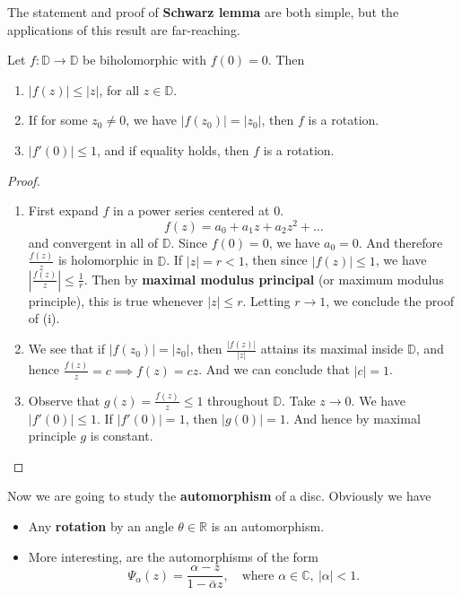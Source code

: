 \documentclass{article}
\begin{document}
The statement and proof of \textbf{Schwarz lemma} are both simple, but the applications of this result are far-reaching.

\begin{lemma}
Let $f: \mathbb{D} \to \mathbb{D}$ be biholomorphic with $f(0)=0$. Then
\begin{enumerate}
    \item $|f(z)| \le |z|$, for all $z \in \mathbb{D}$.
    \item If for some $z_0 \ne 0$, we have $|f(z_0)| = |z_0|$, then $f$ is a rotation.
    \item $|f'(0)| \le 1$, and if equality holds, then $f$ is a rotation.
\end{enumerate}
\end{lemma}


\begin{proof} 
    \begin{enumerate}
\item
First expand $f$ in a power series centered at $0$.
$$f(z) = a_0 + a_1 z + a_2 z^2 + \dots$$
and convergent in all of $\mathbb{D}$. Since $f(0) = 0$, we have $a_0 = 0$.
And therefore $\frac{f(z)}{z}$ is holomorphic in $\mathbb{D}$. If $|z| = r < 1$, then since $|f(z)| \le 1$, we have $|\frac{f(z)}{z}| \le \frac{1}{r}$. Then by \textbf{maximal modulus principal} (or maximum modulus principle), this is true whenever $|z| \le r$.
Letting $r \to 1$, we conclude the proof of (i).
\item 
We see that if $|f(z_0)| = |z_0|$, then $\frac{|f(z)|}{|z|}$ attains its maximal inside $\mathbb{D}$, and hence $\frac{f(z)}{z} = c \implies f(z) = c z$.
And we can conclude that $|c| = 1$.
\item 
Observe that $g(z) = \frac{f(z)}{z} \le 1$ throughout $\mathbb{D}$.
Take $z \to 0$. We have $|f'(0)| \le 1$. If $|f'(0)| = 1$, then $|g(0)| = 1$.
And hence by maximal principle $g$ is constant.
    \end{enumerate}
\end{proof}

Now we are going to study the \textbf{automorphism} of a disc.
Obviously we have
\begin{itemize}
    \item Any \textbf{rotation} by an angle $\theta \in \mathbb{R}$ is an automorphism.
    \item More interesting, are the automorphisms of the form
    $$\Psi_\alpha(z) = \frac{\alpha - z}{1 - \bar{\alpha} z}, \quad \text{where } \alpha \in \mathbb{C}, \ |\alpha| < 1.$$
\end{itemize}
\end{document}
